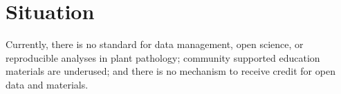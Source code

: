 \documentclass[12pt,letterpaper]{article}
\title{\ruleline{Logic Model}}
\begin{document}
\maketitle




\section{Situation}


Currently, there is no standard for data management, open science, or reproducible analyses in plant pathology; community supported education materials are underused; and there is no mechanism to receive credit for open data and materials.


\end{document}

